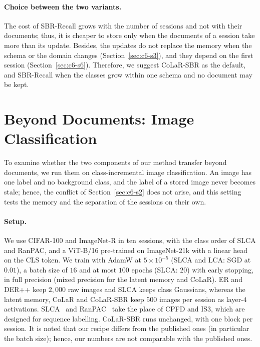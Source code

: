 \paragraph{Choice between the two variants.} The cost of SBR-Recall grows with the number
of sessions and not with their documents; thus, it is cheaper to store only when the
documents of a session take more than its update. Besides, the updates do not replace the
memory when the schema or the domain changes (Section~\ref{sec:c6-s3}), and they depend on
the first session (Section~\ref{sec:c6-s6}). Therefore, we suggest CoLaR-SBR as the default,
and SBR-Recall when the classes grow within one schema and no document may be kept.

\section{Beyond Documents: Image Classification}
\label{sec:c6-s8}

To examine whether the two components of our method transfer beyond documents, we run them
on class-incremental image classification. An image has one label and no background class,
and the label of a stored image never becomes stale; hence, the conflict of
Section~\ref{sec:c6-s2} does not arise, and this setting tests the memory and the
separation of the sessions on their own.

\paragraph{Setup.} We use CIFAR-100 and ImageNet-R in ten sessions, with the class order of
SLCA and RanPAC, and a ViT-B/16 pre-trained on ImageNet-21k with a linear head on the CLS
token. We train with AdamW at $5\times10^{-5}$ (SLCA and LCA: SGD at $0.01$), a batch size
of $16$ and at most $100$ epochs (SLCA: $20$) with early stopping, in full precision (mixed
precision for the latent memory and CoLaR). ER and DER++ keep $2{,}000$ raw images and SLCA
keeps class Gaussians, whereas the latent memory, CoLaR and CoLaR-SBR keep $500$ images
per session as layer-$4$ activations. SLCA~\citep{zhang2023slca} and
RanPAC~\citep{mcdonnell2023ranpac} take the place of CPFD and IS3, which are designed for
sequence labelling. CoLaR-SBR runs unchanged, with one block per session. It is noted that
our recipe differs from the published ones (in particular the batch size); hence, our
numbers are not comparable with the published ones.

\begin{table}[!htbp]
  \centering
  \caption[Image class-incremental learning with ViT-B/16]{\textbf{Image class-incremental
  learning} with ViT-B/16 (mean $\pm$ s.d.\ of three runs; AF: mean). Kept across
  sessions: what a method stores (MB $=10^6$ bytes; ER: computed from its buffer, ours:
  recorded by the runs). $^{p}$Collapses under our shared recipe (AdamW at
  $5\times10^{-5}$, early stopping), far below its published results; we report it for
  completeness and did not tune it to our recipe. Bold: best of each column, joint training
  aside; underlined: our best when a baseline is best.}
  \label{tab:image}
  \resizebox{\textwidth}{!}{}
\end{table}

